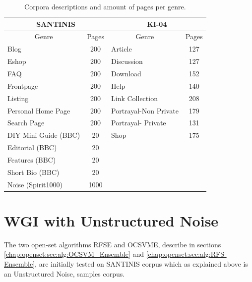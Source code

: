 \begin{table}[t]
\center
\begin{tabular}{|l|l|l|l|}
\hline
\multicolumn{2}{|c|}{SANTINIS} & \multicolumn{2}{c|}{KI-04}\tabularnewline
\hline
\multicolumn{1}{|c|}{Genre} & \multicolumn{1}{c|}{Pages} & \multicolumn{1}{c|}{Genre} & \multicolumn{1}{c|}{Pages}\tabularnewline
\hline
\multicolumn{1}{|l|}{Blog} & \multicolumn{1}{c|}{200} & \multicolumn{1}{l|}{Article} & \multicolumn{1}{c|}{127}\tabularnewline
\multicolumn{1}{|l|}{Eshop} & \multicolumn{1}{c|}{200} & \multicolumn{1}{l|}{Discussion} & \multicolumn{1}{c|}{127}\tabularnewline
\multicolumn{1}{|l|}{FAQ} & \multicolumn{1}{c|}{200} & \multicolumn{1}{l|}{Download} & \multicolumn{1}{c|}{152}\tabularnewline
\multicolumn{1}{|l|}{Frontpage} & \multicolumn{1}{c|}{200} & \multicolumn{1}{l|}{Help} & \multicolumn{1}{c|}{140}\tabularnewline
\multicolumn{1}{|l|}{Listing} & \multicolumn{1}{c|}{200} & \multicolumn{1}{l|}{Link Collection} & \multicolumn{1}{c|}{208}\tabularnewline
\multicolumn{1}{|l|}{Personal Home Page} & \multicolumn{1}{c|}{200} & \multicolumn{1}{l|}{Portrayal-Non Private} & \multicolumn{1}{c|}{179}\tabularnewline
\multicolumn{1}{|l|}{Search Page} & \multicolumn{1}{c|}{200} & \multicolumn{1}{l|}{Portrayal- Private} & \multicolumn{1}{c|}{131}\tabularnewline
\multicolumn{1}{|l|}{DIY Mini Guide (BBC)} & \multicolumn{1}{c|}{20} & \multicolumn{1}{l|}{Shop} & \multicolumn{1}{c|}{175}\tabularnewline
\multicolumn{1}{|l|}{Editorial (BBC)} & \multicolumn{1}{c|}{20} &  & \tabularnewline
\multicolumn{1}{|l|}{Features (BBC)} & \multicolumn{1}{c|}{20} &  & \tabularnewline
\multicolumn{1}{|l|}{Short Bio (BBC)} & \multicolumn{1}{c|}{20} &  & \tabularnewline
\multicolumn{1}{|l|}{Noise (Spirit1000)} & \multicolumn{1}{c|}{1000} &  & \tabularnewline
\hline
\end{tabular}
\caption {Corpora descriptions and amount of pages per genre.}
\label{chap:noise:tbl:genre_tags}
\end{table}


\section{WGI with Unstructured Noise}\label{chap:noise:sec:WGI_noise}

The two open-set algorithms RFSE and OCSVME, describe in sections \ref{chap:openset:sec:alg:OCSVM_Ensemble} and \ref{chap:openset:sec:alg:RFS-Ensemble}, are initially tested on SANTINIS corpus which as explained above is an Unstructured Noise, samples corpus.   

